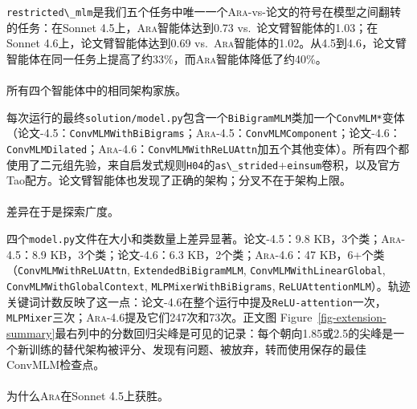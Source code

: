 \documentclass[
]{article}
\makeatletter
\let\oldparagraph\paragraph
\renewcommand{\paragraph}{
    \@ifstar
      \xxxParagraphStar
      \xxxParagraphNoStar
  }
\newcommand{\xxxParagraphStar}[1]{\oldparagraph*{#1}\mbox{}}
\newcommand{\xxxParagraphNoStar}[1]{\oldparagraph{#1}\mbox{}}
\newcommand{\passthrough}[1]{#1}
\theoremstyle{definition}
\newcommand{\ara}{\textsc{Ara}}
\makeatother
\begin{document}
\passthrough{\lstinline!restricted\_mlm!}是我们五个任务中唯一一个\ara{}-vs-论文的符号在模型之间翻转的任务：在Sonnet
4.5上，\ara{}智能体达到0.73 vs.~论文臂智能体的1.03；在Sonnet
4.6上，论文臂智能体达到0.69
vs.~\ara{}智能体的1.02。从4.5到4.6，论文臂智能体在同一任务上提高了约33\%，而\ara{}智能体降低了约40\%。

\paragraph{所有四个智能体中的相同架构家族。}\label{ux6240ux6709ux56dbux4e2aux667aux80fdux4f53ux4e2dux7684ux76f8ux540cux67b6ux6784ux5bb6ux65cf}

每次运行的最终\passthrough{\lstinline!solution/model.py!}包含一个\passthrough{\lstinline!BiBigramMLM!}类加一个\passthrough{\lstinline!ConvMLM*!}变体（论文-4.5：\passthrough{\lstinline!ConvMLMWithBiBigrams!}；\ara{}-4.5：\passthrough{\lstinline!ConvMLMComponent!}；论文-4.6：\passthrough{\lstinline!ConvMLMDilated!}；\ara{}-4.6：\passthrough{\lstinline!ConvMLMWithReLUAttn!}加五个其他变体）。所有四个都使用了二元组先验，来自启发式规则\passthrough{\lstinline!H04!}的\passthrough{\lstinline!as\_strided!}+\passthrough{\lstinline!einsum!}卷积，以及官方Tao配方。论文臂智能体也发现了正确的架构；分叉不在于架构上限。

\paragraph{差异在于是探索广度。}\label{ux5deeux5f02ux5728ux4e8eux662fux63a2ux7d22ux5e7fux5ea6}

四个\passthrough{\lstinline!model.py!}文件在大小和类数量上差异显著。论文-4.5：9.8
KB，3个类；\ara{}-4.5：8.9 KB，3个类；论文-4.6：6.3
KB，2个类；\ara{}-4.6：47
KB，6+个类（\passthrough{\lstinline!ConvMLMWithReLUAttn!},
\passthrough{\lstinline!ExtendedBiBigramMLM!},
\passthrough{\lstinline!ConvMLMWithLinearGlobal!},
\passthrough{\lstinline!ConvMLMWithGlobalContext!},
\passthrough{\lstinline!MLPMixerWithBiBigrams!},
\passthrough{\lstinline!ReLUAttentionMLM!}）。轨迹关键词计数反映了这一点：论文-4.6在整个运行中提及\passthrough{\lstinline!ReLU-attention!}一次，\passthrough{\lstinline!MLPMixer!}三次；\ara{}-4.6提及它们247次和73次。正文图
Figure~\ref{fig-extension-summary}最右列中的分数回归尖峰是可见的记录：每个朝向1.85或2.5的尖峰是一个新训练的替代架构被评分、发现有问题、被放弃，转而使用保存的最佳ConvMLM检查点。

\paragraph{\texorpdfstring{为什么\ara{}在Sonnet
4.5上获胜。}{为什么在Sonnet 4.5上获胜。}}\label{ux4e3aux4ec0ux4e48b58fc729-690b-4000-b19f-365a4093b2ff7b7b3c207465726d20617261203e7d7dux5728sonnet-4.5ux4e0aux83b7ux80dc}
\end{document}
